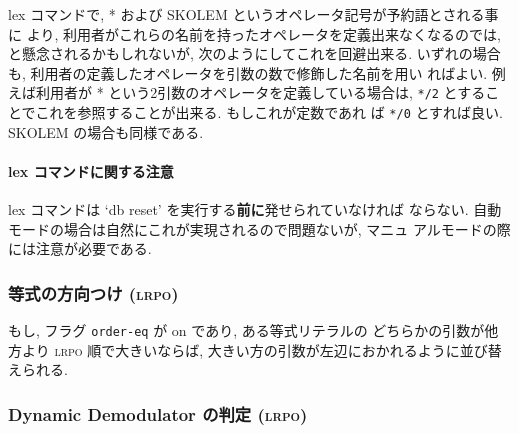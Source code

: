 lex コマンドで, * および SKOLEM というオペレータ記号が予約語とされる事に
より,  利用者がこれらの名前を持ったオペレータを定義出来なくなるのでは,
と懸念されるかもしれないが, 次のようにしてこれを回避出来る.
いずれの場合も, 利用者の定義したオペレータを引数の数で修飾した名前を用い
ればよい. 例えば利用者が * という2引数のオペレータを定義している場合は,
\texttt{*/2} とすることでこれを参照することが出来る. もしこれが定数であれ
ば \texttt{*/0} とすれば良い. SKOLEM の場合も同様である.

\paragraph{lex コマンドに関する注意}
lex コマンドは `db reset' を実行する\textbf{前に}発せられていなければ
ならない. 自動モードの場合は自然にこれが実現されるので問題ないが, マニュ
アルモードの際には注意が必要である. 


\subsubsection{等式の方向つけ (\textsc{lrpo})} \label{sec:orient-lrpo}

もし, フラグ \texttt{order-eq} が on であり, ある等式リテラルの
どちらかの引数が他方より \textsc{lrpo} 順で大きいならば, 
大きい方の引数が左辺におかれるように並び替えられる.

\subsubsection{Dynamic Demodulator の判定 (\textsc{lrpo})} \label{sec:dynamic-lrpo}

